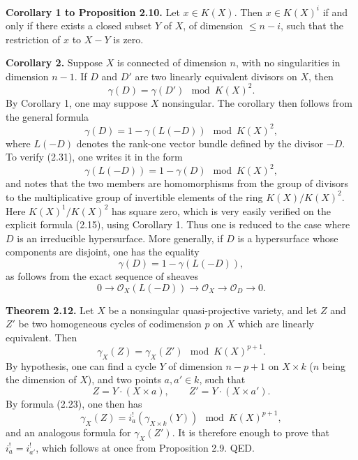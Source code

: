 \documentclass[11pt]{article}
\providecommand{\cO}{\mathcal O}
\begin{document}
\textbf{Corollary 1 to Proposition 2.10.} Let $x\in K(X)$. Then $x\in K(X)^i$ if and only if there exists a closed subset $Y$ of $X$, of dimension $\leq n-i$, such that the restriction of $x$ to $X-Y$ is zero.

\textbf{Corollary 2.} Suppose $X$ is connected of dimension $n$, with no singularities in dimension $n-1$. If $D$ and $D'$ are two linearly equivalent divisors on $X$, then
\[
 \gamma(D)=\gamma(D')\mod K(X)^2.
\]
By Corollary 1, one may suppose $X$ nonsingular. The corollary then follows from the general formula
\begin{equation}\tag{2.31}
 \gamma(D)=1-\gamma(L(-D))\mod K(X)^2,
\end{equation}
where $L(-D)$ denotes the rank-one vector bundle defined by the divisor $-D$. To verify (2.31), one writes it in the form
\begin{equation}\tag{2.31 bis}
 \gamma(L(-D))=1-\gamma(D)\mod K(X)^2,
\end{equation}
and notes that the two members are homomorphisms from the group of divisors to the multiplicative group of invertible elements of the ring $K(X)/K(X)^2$. Here $K(X)^1/K(X)^2$ has square zero, which is very easily verified on the explicit formula (2.15), using Corollary 1. Thus one is reduced to the case where $D$ is an irreducible hypersurface. More generally, if $D$ is a hypersurface whose components are disjoint, one has the equality
\begin{equation}\tag{2.32}
 \gamma(D)=1-\gamma(L(-D)),
\end{equation}
as follows from the exact sequence of sheaves
\[
0\longrightarrow \cO_X(L(-D))\longrightarrow \cO_X\longrightarrow \cO_D\longrightarrow 0.
\]

\textbf{Theorem 2.12.} Let $X$ be a nonsingular quasi-projective variety, and let $Z$ and $Z'$ be two homogeneous cycles of codimension $p$ on $X$ which are linearly equivalent. Then
\begin{equation}\tag{2.33}
 \gamma_X(Z)=\gamma_X(Z')\mod K(X)^{p+1}.
\end{equation}
By hypothesis, one can find a cycle $Y$ of dimension $n-p+1$ on $X\times k$ ($n$ being the dimension of $X$), and two points $a,a'\in k$, such that
\[
 Z=Y\cdot (X\times a),\qquad Z'=Y\cdot (X\times a').
\]
By formula (2.23), one then has
\[
 \gamma_X(Z)=i_a^!(\gamma_{X\times k}(Y))\mod K(X)^{p+1},
\]
and an analogous formula for $\gamma_X(Z')$. It is therefore enough to prove that $i_a^!=i_{a'}^!$, which follows at once from Proposition 2.9. QED.
\end{document}
